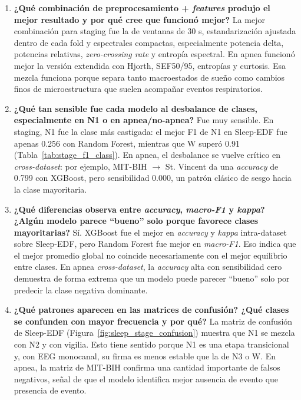 \begin{enumerate}[leftmargin=*]
\item \textbf{¿Qu\'e combinaci\'on de preprocesamiento + \emph{features} produjo el mejor resultado y por qu\'e cree que funcion\'o mejor?} La mejor combinaci\'on para staging fue la de ventanas de 30 s, estandarizaci\'on ajustada dentro de cada fold y  espectrales compactas, especialmente potencia delta, potencias relativas, \emph{zero-crossing rate} y entrop\'ia espectral. En apnea funcion\'o mejor la versi\'on extendida con Hjorth, SEF50/95, entrop\'ias y curtosis. Esa mezcla funciona porque separa tanto macroestados de sue\~no como cambios finos de microestructura que suelen acompa\~nar eventos respiratorios.

\item \textbf{¿Qu\'e tan sensible fue cada modelo al desbalance de clases, especialmente en N1 o en apnea/no-apnea?} Fue muy sensible. En staging, N1 fue la clase m\'as castigada: el mejor F1 de N1 en Sleep-EDF fue apenas 0.256 con Random Forest, mientras que W super\'o 0.91 (Tabla~\ref{tab:stage_f1_class}). En apnea, el desbalance se vuelve cr\'itico en \emph{cross-dataset}: por ejemplo, MIT-BIH \(\rightarrow\) St. Vincent da una \emph{accuracy} de 0.799 con XGBoost, pero sensibilidad 0.000, un patr\'on cl\'asico de sesgo hacia la clase mayoritaria.

\item \textbf{¿Qu\'e diferencias observa entre \emph{accuracy}, \emph{macro-F1} y \emph{kappa}? ¿Alg\'un modelo parece ``bueno'' solo porque favorece clases mayoritarias?} S\'i. XGBoost fue el mejor en \emph{accuracy} y \emph{kappa} intra-dataset sobre Sleep-EDF, pero Random Forest fue mejor en \emph{macro-F1}. Eso indica que el mejor promedio global no coincide necesariamente con el mejor equilibrio entre clases. En apnea \emph{cross-dataset}, la \emph{accuracy} alta con sensibilidad cero demuestra de forma extrema que un modelo puede parecer ``bueno'' solo por predecir la clase negativa dominante.

\item \textbf{¿Qu\'e patrones aparecen en las matrices de confusi\'on? ¿Qu\'e clases se confunden con mayor frecuencia y por qu\'e?} La matriz de confusi\'on de Sleep-EDF (Figura~\ref{fig:sleep_stage_confusion}) muestra que N1 se mezcla con N2 y con vigilia. Esto tiene sentido porque N1 es una etapa transicional y, con EEG monocanal, su firma es menos estable que la de N3 o W. En apnea, la matriz de MIT-BIH confirma una cantidad importante de falsos negativos, se\~nal de que el modelo identifica mejor ausencia de evento que presencia de evento.


\end{enumerate}
